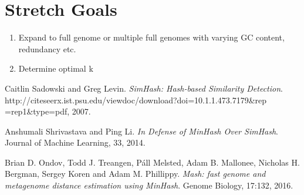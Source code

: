 \documentclass[12pt, letterpaper]{article}
\begin{document}
\section*{Stretch Goals}

\begin{enumerate}
\item Expand to full genome or multiple full genomes with varying GC content, redundancy etc.
\item Determine optimal k
\end{enumerate}

\begin{thebibliography}{9}


  Caitlin Sadowski and Greg Levin.
  \textit{SimHash: Hash-based Similarity Detection}.
  http://citeseerx.ist.psu.edu/viewdoc/download?doi=10.1.1.473.7179\&rep\\=rep1\&type=pdf, 
  2007.

  Anshumali Shrivastava and Ping Li.
  \textit{In Defense of MinHash Over SimHash}.
  Journal of Machine Learning, 33, 2014.

  Brian D. Ondov, Todd J. Treangen, Páll Melsted, Adam B. Mallonee, Nicholas H. Bergman, Sergey Koren and Adam M. Phillippy.
  \textit{Mash: fast genome and metagenome distance estimation using MinHash}.
  Genome Biology, 17:132, 2016.

\end{thebibliography}
\end{document}

